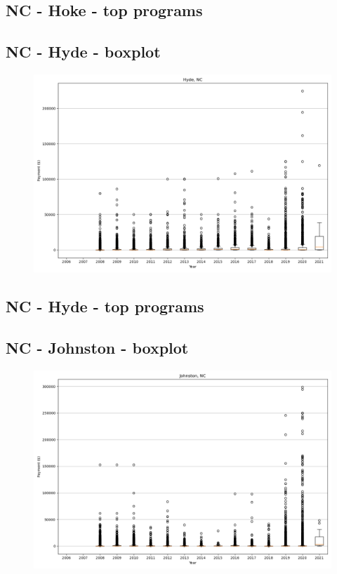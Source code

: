\subsection*{NC - Hoke - top programs}

\newpage
\subsection*{NC - Hyde - boxplot}
\begin{figure}[h]
\centering
\includegraphics[width=7in]{../output/boxplots/counties/Hyde-NC_boxplot.png}
\end{figure}


\subsection*{NC - Hyde - top programs}

\newpage
\subsection*{NC - Johnston - boxplot}
\begin{figure}[h]
\centering
\includegraphics[width=7in]{../output/boxplots/counties/Johnston-NC_boxplot.png}
\end{figure}


